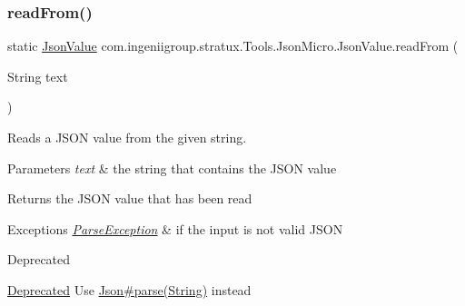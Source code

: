 \subsubsection{\texorpdfstring{read\+From()}{readFrom()}\hspace{0.1cm}{\footnotesize\ttfamily [2/2]}}
{\footnotesize\ttfamily static \hyperlink{classcom_1_1ingeniigroup_1_1stratux_1_1_tools_1_1_json_micro_1_1_json_value}{Json\+Value} com.\+ingeniigroup.\+stratux.\+Tools.\+Json\+Micro.\+Json\+Value.\+read\+From (\begin{DoxyParamCaption}\item[{String}]{text }\end{DoxyParamCaption})\hspace{0.3cm}{\ttfamily [static]}}

Reads a J\+S\+ON value from the given string.


\begin{DoxyParams}{Parameters}
{\em text} & the string that contains the J\+S\+ON value \\
\hline
\end{DoxyParams}
\begin{DoxyReturn}{Returns}
the J\+S\+ON value that has been read 
\end{DoxyReturn}

\begin{DoxyExceptions}{Exceptions}
{\em \hyperlink{classcom_1_1ingeniigroup_1_1stratux_1_1_tools_1_1_json_micro_1_1_parse_exception}{Parse\+Exception}} & if the input is not valid J\+S\+ON \\
\hline
\end{DoxyExceptions}
\begin{DoxyRefDesc}{Deprecated}
\item[\hyperlink{deprecated__deprecated000009}{Deprecated}]Use \hyperlink{classcom_1_1ingeniigroup_1_1stratux_1_1_tools_1_1_json_micro_1_1_json_a0d4456dc115b1540337d2475ed2e3d55}{Json\#parse(\+String)} instead \end{DoxyRefDesc}
\mbox{\label{classcom_1_1ingeniigroup_1_1stratux_1_1_tools_1_1_json_micro_1_1_json_value_a4a4c7c52f20eb175c506580b1d1ccb3e}} 
